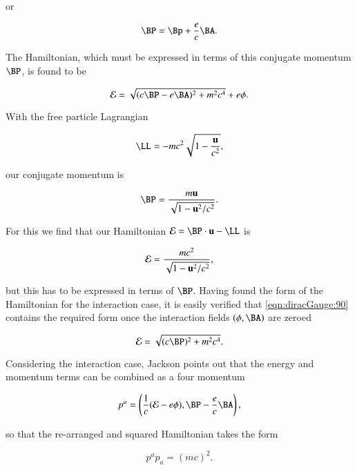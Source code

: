 or

\begin{equation}\label{eqn:diracGauge:70}
\BP = \Bp + \frac{e}{c} \BA.
\end{equation}

The Hamiltonian, which must be expressed in terms of this conjugate momentum $\BP$, is found to be

\begin{equation}\label{eqn:diracGauge:90}
\mathcal{E} = \sqrt{ (c \BP - e \BA)^2 + m^2 c^4 } + e \phi.
\end{equation}

With the free particle Lagrangian

\begin{equation}\label{eqn:diracGauge:110}
\LL = -m c^2 \sqrt{ 1 - \frac{\Bu}{c^2}} ,
\end{equation}

our conjugate momentum is

\begin{equation}\label{eqn:diracGauge:130}
\BP = \frac{m \Bu}{\sqrt{ 1 - \Bu^2/c^2} }.
\end{equation}

For this we find that our Hamiltonian $\mathcal{E} = \BP \cdot \Bu - \LL$ is

\begin{equation}\label{eqn:diracGauge:150}
\mathcal{E} = \frac{m c^2}{\sqrt{1 - \mathbf{u}^2/c^2}},
\end{equation}

but this has to be expressed in terms of $\BP$.  Having found the form of the Hamiltonian for the interaction case, it is easily verified that \ref{eqn:diracGauge:90} contains the required form once the interaction fields $(\phi, \BA)$ are zeroed

\begin{equation}\label{eqn:diracGauge:90b}
\mathcal{E} = \sqrt{ (c \BP)^2 + m^2 c^4 }.
\end{equation}

Considering the interaction case, Jackson points out that the energy and momentum terms can be combined as a four momentum

\begin{equation}\label{eqn:diracGauge:170}
p^a = \left( \inv{c}(\mathcal{E} - e \phi), \BP - \frac{e}{c}\BA \right),
\end{equation}

so that the re-arranged and squared Hamiltonian takes the form

\begin{equation}\label{eqn:diracGauge:190}
p^a p_a = (m c)^2.
\end{equation}

